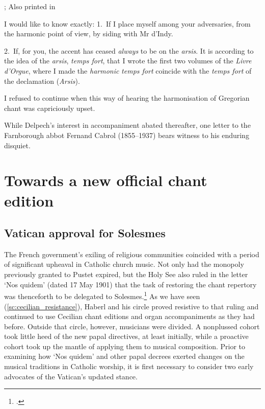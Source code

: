  {; Also printed in \cite[421--2]{HalaSolesmesmusiciensSchola2017}}
{I would like to know exactly: 1.\ If I place myself among your adversaries, from the harmonic point of view, by siding with Mr d'Indy.

\parindent=10pt
2.\ If, for you, the accent has ceased \emph{always} to be on the \emph{arsis}. It is according to the idea of the \emph{arsis}, \emph{temps fort}, that I wrote the first two volumes of the \emph{Livre d'Orgue}, where I made the \emph{harmonic} \emph{temps fort} coincide with the \emph{temps fort} of the declamation (\emph{Arsis}).

\parindent=10pt
I refused to continue when this way of hearing the harmonisation of Gregorian chant was capriciously upset.}
\noindent
While Delpech's interest in accompaniment abated thereafter, one letter to the Farnborough abbot Fernand Cabrol (1855--1937) bears witness to his enduring disquiet.


\section{Towards a new official chant edition}
\subsection{Vatican approval for Solesmes}
The French government's exiling of religious communities coincided with a period of significant upheaval in Catholic church music.
Not only had the monopoly previously granted to Pustet expired, but the Holy See also ruled in the letter `Nos quidem' (dated 17 May 1901) that the task of restoring the chant repertory was thenceforth to be delegated to Solesmes.\footcite[182--191]{HayburnPapalLegislationSacred1979}
As we have seen (\cref{sc:cecilian_resistance}), Haberl and his circle proved resistive to that ruling and continued to use Cecilian chant editions and organ accompaniments as they had before.
Outside that circle, however, musicians were divided.
A nonplussed cohort took little heed of the new papal directives, at least initially, while a proactive cohort took up the mantle of applying them to musical composition.
Prior to examining how `Nos quidem' and other papal decrees exerted changes on the musical traditions in Catholic worship, it is first necessary to consider two early advocates of the Vatican's updated stance.


